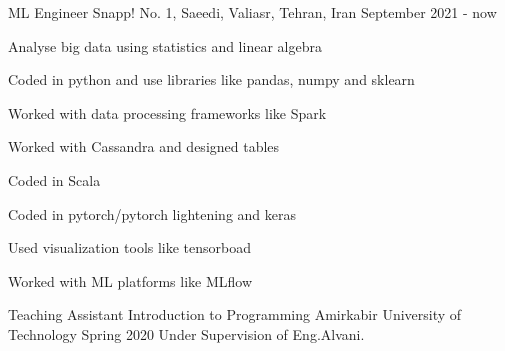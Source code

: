 \begin{cventries}
  \cventry
    {ML Engineer} %
    {Snapp!} %
    {No. 1, Saeedi, Valiasr, Tehran, Iran} %
    {September 2021 - now} %
    {
      \begin{cvitems} %
        \item {Analyse big data using statistics and linear algebra}
        \item {Coded in python and use libraries like pandas, numpy and sklearn}
        \item {Worked with data processing frameworks like Spark}
        \item {Worked with Cassandra and designed tables}
        \item {Coded in Scala}
        \item {Coded in pytorch/pytorch lightening and keras}
        \item {Used visualization tools like tensorboad}
        \item {Worked with ML platforms like MLflow}
      \end{cvitems}
    }

\end{cventries}



\begin{cventries}

  \cventry
    {Teaching Assistant} %
    {Introduction to Programming} %
    {Amirkabir University of Technology} %
    {Spring 2020} %
    {Under Supervision of Eng.Alvani.}


\end{cventries}
